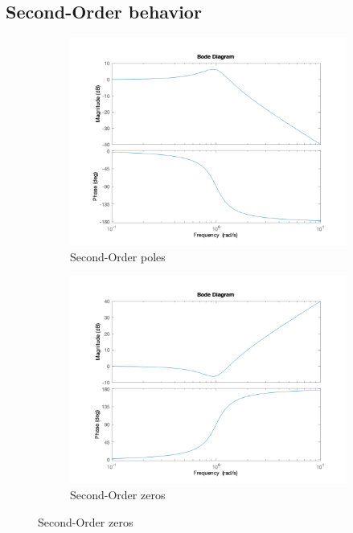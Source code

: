\subsection*{Second-Order behavior}
\begin{figure}[!h]
  \centering
  \begin{subfigure}[b]{0.45\textwidth}	
	\includegraphics[width=\textwidth]{Images/bode_2nd_order_denom}
	\caption{Second-Order poles}
	\label{fig:bode-2nd-order-pole}
  \end{subfigure}
  \begin{subfigure}[b]{0.45\textwidth}	
	\includegraphics[width=\textwidth]{Images/bode_2nd_order_num}
	\caption{Second-Order zeros}
	\label{fig:bode-2nd-order-zero}
  \end{subfigure}
\end{figure}
\clearpage
